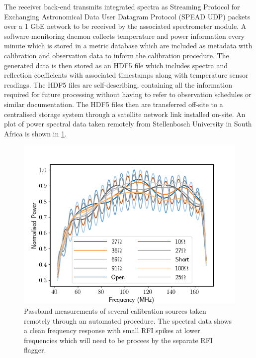 The receiver back-end transmits integrated spectra as Streaming Protocol for Exchanging Astronomical Data User Datagram Protocol (SPEAD UDP) packets over a 1 GbE network to be received by the associated spectrometer module. A software monitoring daemon collects temperature and power information every minute which is stored in a metric database which are included as metadata with calibration and observation data to inform the calibration procedure. The generated data is then stored as an HDF5 file which includes spectra and reflection coefficients with associated timestamps along with temperature sensor readings. The HDF5 files are self-describing, containing all the information required for future processing without having to refer to observation schedules or similar documentation. The HDF5 files then are transferred off-site to a centralised storage system through a satellite network link installed on-site. An plot of power spectral data taken remotely from Stellenbosch University in South Africa is shown in \cref{fig:remote_data}.
\begin{figure}
    \centering
    \includegraphics[scale=0.6]{remote_data}
    \caption{Passband measurements of several calibration sources taken remotely through an automated procedure. The spectral data shows a clean frequency response with small RFI spikes at lower frequencies which will need to be procees by the separate RFI flagger.}
    \label{fig:remote_data}
\end{figure}


